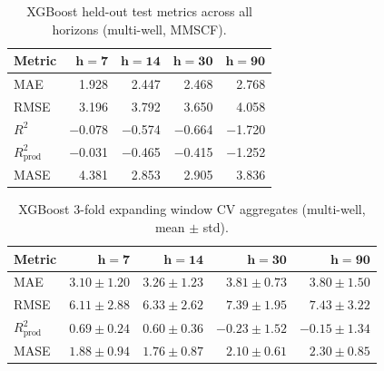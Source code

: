 \documentclass[10pt]{article}
\begin{document}
\begin{table}[ht]
\centering
\caption{XGBoost held-out test metrics across all horizons (multi-well, MMSCF).}
\label{tab:xgboost_multiwell_full}
\small
\begin{tabular}{@{}l rrrr @{}}
\toprule
\textbf{Metric} & $\boldsymbol{h{=}7}$ & $\boldsymbol{h{=}14}$ & $\boldsymbol{h{=}30}$ & $\boldsymbol{h{=}90}$ \\
\midrule
MAE             &  1.928 &  2.447 &  2.468 &  2.768 \\
RMSE            &  3.196 &  3.792 &  3.650 &  4.058 \\
$R^2$           & $-$0.078 & $-$0.574 & $-$0.664 & $-$1.720 \\
$R^2_\text{prod}$ & $-$0.031 & $-$0.465 & $-$0.415 & $-$1.252 \\
MASE            &  4.381 &  2.853 &  2.905 &  3.836 \\
\bottomrule
\end{tabular}
\end{table}


\begin{table}[ht]
\centering
\caption{XGBoost 3-fold expanding window CV aggregates (multi-well, mean $\pm$ std).}
\label{tab:xgboost_cv}
\small
\begin{tabular}{@{}l rrrr @{}}
\toprule
\textbf{Metric} & $\boldsymbol{h{=}7}$ & $\boldsymbol{h{=}14}$ & $\boldsymbol{h{=}30}$ & $\boldsymbol{h{=}90}$ \\
\midrule
MAE             & $3.10 \pm 1.20$ & $3.26 \pm 1.23$ & $3.81 \pm 0.73$ & $3.80 \pm 1.50$ \\
RMSE            & $6.11 \pm 2.88$ & $6.33 \pm 2.62$ & $7.39 \pm 1.95$ & $7.43 \pm 3.22$ \\
$R^2_\text{prod}$ & $0.69 \pm 0.24$ & $0.60 \pm 0.36$ & $-0.23 \pm 1.52$ & $-0.15 \pm 1.34$ \\
MASE            & $1.88 \pm 0.94$ & $1.76 \pm 0.87$ & $2.10 \pm 0.61$ & $2.30 \pm 0.85$ \\
\bottomrule
\end{tabular}
\end{table}
\end{document}
